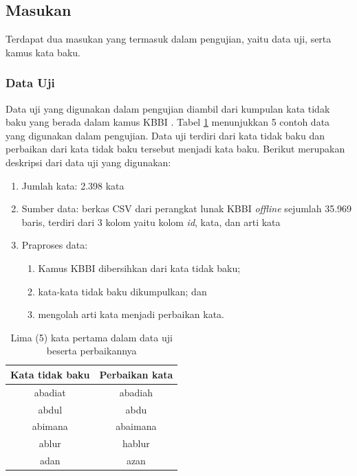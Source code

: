 \subsection{Masukan}

Terdapat dua masukan yang termasuk dalam pengujian, yaitu data uji, serta kamus kata baku.

\subsubsection{Data Uji}

Data uji yang digunakan dalam pengujian diambil dari kumpulan kata tidak baku yang berada dalam kamus KBBI \parencite{sinaukbbi}. Tabel \ref{tbl:test_data} menunjukkan 5 contoh data yang digunakan dalam pengujian. Data uji terdiri dari kata tidak baku dan perbaikan dari kata tidak baku tersebut menjadi kata baku. Berikut merupakan deskripsi dari data uji yang digunakan:
\begin{enumerate}
    \item Jumlah kata: 2.398 kata
    \item Sumber data: berkas CSV dari perangkat lunak KBBI \textit{offline} \parencite{sinaukbbi} sejumlah 35.969 baris, terdiri dari 3 kolom yaitu kolom \textit{id}, kata, dan arti kata
    \item Praproses data: \begin{enumerate}
        \item Kamus KBBI dibersihkan dari kata tidak baku;
        \item kata-kata tidak baku dikumpulkan; dan
        \item mengolah arti kata menjadi perbaikan kata.
    \end{enumerate}
\end{enumerate}
\begin{table}[ht]
    \captionsetup{justification=justified,singlelinecheck=false}
    \caption{Lima (5) kata pertama dalam data uji beserta perbaikannya}
    \label{tbl:test_data}
    \centering
    \begin{tabular}{|c|c|}
        \hline
        \textbf{Kata tidak baku} & \textbf{Perbaikan kata} \\ \hline
        abadiat & abadiah \\
        abdul & abdu \\
        abimana & abaimana \\
        ablur & hablur \\
        adan & azan \\ \hline
    \end{tabular}
\end{table}

